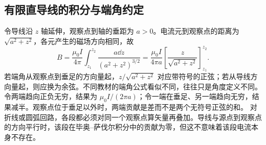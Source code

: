 \subsection{有限直导线的积分与端角约定}
令导线沿 $z$ 轴延伸，观察点到轴的垂距为 $a>0$。电流元到观察点的距离为 $\sqrt{a^2+z^2}$，各元产生的磁场方向相同，故
\[
 B=\frac{\mu_0I}{4\pi}\int_{z_1}^{z_2}\frac{a\dd z}{(a^2+z^2)^{3/2}}
 =\frac{\mu_0I}{4\pi a}\left[\frac z{\sqrt{a^2+z^2}}\right]_{z_1}^{z_2}.
\]
若端角从观察点到垂足的方向量起，$z/\sqrt{a^2+z^2}$ 对应带符号的正弦；若从导线方向量起，则应换为余弦。不同教材的端角公式看似不同，往往只是角度定义不同。
令两端趋向正负无穷，结果为 $\mu_0I/(2\pi a)$；令一端在垂足、另一端趋向无穷，结果减半。观察点位于垂足以外时，两端贡献是差而不是两个无符号正弦的和。
对折线或圆弧回路，各段都必须对同一个观察点算矢量再叠加。导线与源点到观察点的方向平行时，该段在毕奥--萨伐尔积分中的贡献为零，但这不意味着该段电流本身不存在。

